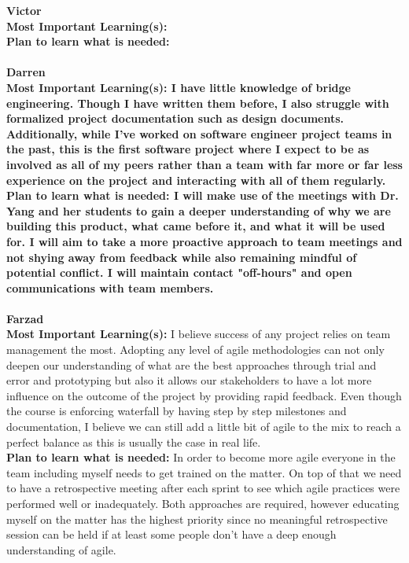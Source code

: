 \documentclass[12pt]{article}
\begin{document}
\noindent\textbf{Victor}\\
\textbf{Most Important Learning(s):}\\
\textbf{Plan to learn what is needed:}\\\\

\noindent\textbf{Darren}\\
\textbf{Most Important Learning(s): I have little knowledge of bridge engineering. Though I have written them before, I also struggle with formalized project documentation such as design documents. Additionally, while I've worked on software engineer project teams in the past, this is the first software project where I expect to be as involved as all of my peers rather than a team with far more or far less experience on the project and interacting with all of them regularly.}\\
\textbf{Plan to learn what is needed: I will make use of the meetings with Dr. Yang and her students to gain a deeper understanding of why we are building this product, what came before it, and what it will be used for. I will aim to take a more proactive approach to team meetings and not shying away from feedback while also remaining mindful of potential conflict. I will maintain contact "off-hours" and open communications with team members.}\\\\

\noindent\textbf{Farzad}\\
\textbf{Most Important Learning(s):} I believe success of any project relies on team management the most. Adopting any level of agile methodologies can not only deepen our understanding of what are the best approaches through trial and error and prototyping but also it allows our stakeholders to have a lot more influence on the outcome of the project by providing rapid feedback. Even though the course is enforcing waterfall by having step by step milestones and documentation, I believe we can still add a little bit of agile to the mix to reach a perfect balance as this is usually the case in real life.\\
\textbf{Plan to learn what is needed:} In order to become more agile everyone in the team including myself needs to get trained on the matter. On top of that we need to have a retrospective meeting after each sprint to see which agile practices were performed well or inadequately. Both approaches are required, however educating myself on the matter has the highest priority since no meaningful retrospective session can be held if at least some people don't have a deep enough understanding of agile.\\\\
\end{document}
